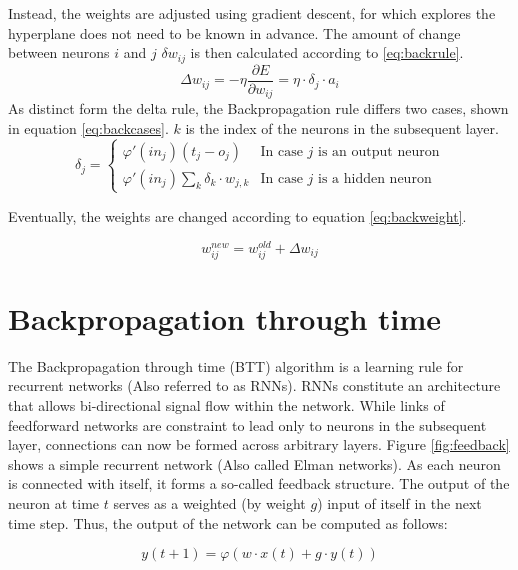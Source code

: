 \documentclass[10pt,a4paper,DIV=11]{scrreprt}
\begin{document}
Instead, the weights are adjusted using gradient descent, for which explores the hyperplane does not need to be known in advance. 
The amount of change between neurons $i$ and $j$ $\delta w_{ij}$ is then calculated according to \eqref{eq:backrule}.
\begin{equation}
\Delta w_{ij} = -\eta \frac{\partial E}{\partial w_{ij}} = \eta \cdot \delta_j \cdot a_i
\label{eq:backrule}
\end{equation}
As distinct form the delta rule, the Backpropagation rule differs two cases, shown in equation \eqref{eq:backcases}. 
$k$ is the index of the neurons in the subsequent layer.
\begin{equation}
   \delta_j =
   \begin{cases}
     \varphi'(in_j)(t_j-o_j) & \text{In case $j$ is an output neuron} \\
     \varphi'(in_j)\sum_{k} \delta_k \cdot w_{j,k} & \text{In case $j$ is a hidden neuron}
   \end{cases}
\label{eq:backcases}
\end{equation}

Eventually, the weights are changed according to equation \eqref{eq:backweight}.

\begin{equation}
   w_{ij}^{new} = w_{ij}^{old} + \Delta w_{ij}
\label{eq:backweight}
\end{equation}

\section{Backpropagation through time}

The Backpropagation through time (BTT) algorithm is a learning rule for recurrent networks (Also referred to as RNNs). 
RNNs constitute an architecture that allows bi-directional signal flow within the network. While links of feedforward networks are constraint to 
lead only to neurons in the subsequent layer, connections can now be formed across arbitrary layers. Figure \ref{fig:feedback} shows a 
simple recurrent network (Also called Elman networks). As each neuron is connected with itself, it forms a so-called feedback structure. 
The output of the neuron at time $t$ serves as a weighted (by weight $g$) input of itself in the next time step.
Thus, the output of the network can be computed as follows:

\begin{equation}
    y(t+1) = \varphi(w\cdot x(t) + g\cdot y(t))
\label{eq:btt}
\end{equation}
\end{document}

